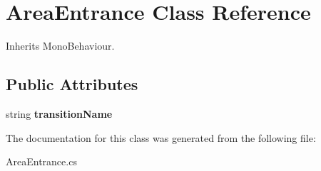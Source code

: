 \hypertarget{class_area_entrance}{}\section{Area\+Entrance Class Reference}
\label{class_area_entrance}


Inherits Mono\+Behaviour.

\subsection*{Public Attributes}
\begin{DoxyCompactItemize}
\item 
\mbox{\label{class_area_entrance_ae792d05fac3f4f816f69c2a514ecceb2}} 
string {\bfseries transition\+Name}
\end{DoxyCompactItemize}


The documentation for this class was generated from the following file\+:\begin{DoxyCompactItemize}
\item 
Area\+Entrance.\+cs\end{DoxyCompactItemize}
